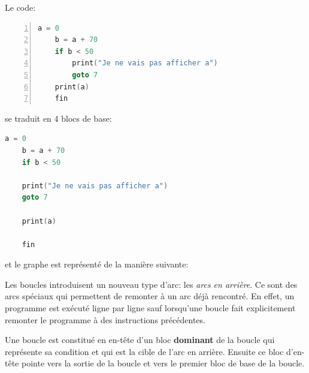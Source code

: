 Le code:
\begin{lstlisting}[language=c, numbers=left, xleftmargin=.35\textwidth, caption={Exemple de code à transformer}, captionpos=b]
    a = 0
    b = a + 70
    if b < 50
        print("Je ne vais pas afficher a")
        goto 7
    print(a)
    fin
\end{lstlisting}
se traduit en 4 blocs de base:
\newpage
\begin{lstlisting}[language=c, xleftmargin=.26\textwidth, caption={Séparation du code précédent en blocs de base}, captionpos=b]
    a = 0
    b = a + 70
    if b < 50

    print("Je ne vais pas afficher a")
    goto 7

    print(a)

    fin
\end{lstlisting}
et le graphe est représenté de la manière suivante:
\begin{center}
\end{center}

Les boucles introduisent un nouveau type d'arc: les \textit{arcs en arrière}. Ce sont des arcs spéciaux qui permettent de remonter à un arc déjà rencontré. En effet, un programme est exécuté ligne par ligne sauf lorsqu'une boucle fait explicitement remonter le programme à des instructions précédentes. 

Une boucle est constitué en en-tête d'un bloc \textbf{dominant} de la boucle qui représente sa condition et qui est la cible de l'arc en arrière. Ensuite ce bloc d'en-tête pointe vers la sortie de la boucle et vers le premier bloc de base de la boucle.

